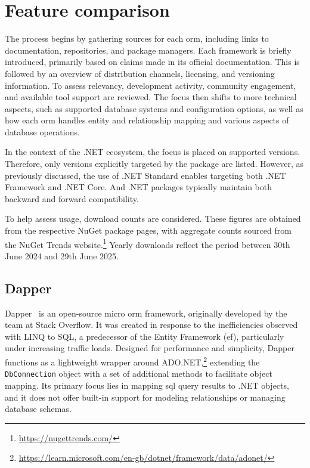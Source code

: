 \section{Feature comparison}
The process begins by gathering sources for each \acrshort{orm}, including links to documentation, repositories, and package managers. Each framework is briefly introduced, primarily based on claims made in its official documentation. This is followed by an overview of distribution channels, licensing, and versioning information. To assess relevancy, development activity, community engagement, and available tool support are reviewed. The focus then shifts to more technical aspects, such as supported database systems and configuration options, as well as how each \acrshort{orm} handles entity and relationship mapping and various aspects of database operations.

In the context of the .NET ecosystem, the focus is placed on supported versions. Therefore, only versions explicitly targeted by the package are listed. However, as previously discussed, the use of .NET Standard enables targeting both .NET Framework and .NET Core. And .NET packages typically maintain both backward and forward compatibility.

To help assess usage, download counts are considered. These figures are obtained from the respective NuGet package pages, with aggregate counts sourced from the NuGet Trends website.\footnote{\url{https://nugettrends.com/}} Yearly downloads reflect the period between 30th June 2024 and 29th June 2025.

\subsection{Dapper}
\label{sec:feat_dapper}

Dapper~\cite{Dapper,DapperRepo} is an open-source micro \acrshort{orm} framework, originally developed by the team at Stack Overflow. It was created in response to the inefficiencies observed with LINQ to SQL, a predecessor of the Entity Framework (\acrshort{ef}), particularly under increasing traffic loads. Designed for performance and simplicity, Dapper functions as a lightweight wrapper around ADO.NET,\footnote{\url{https://learn.microsoft.com/en-gb/dotnet/framework/data/adonet/}} extending the \texttt{DbConnection} object with a set of additional methods to facilitate object mapping. Its primary focus lies in mapping \acrshort{sql} query results to .NET objects, and it does not offer built-in support for modeling relationships or managing database schemas.

